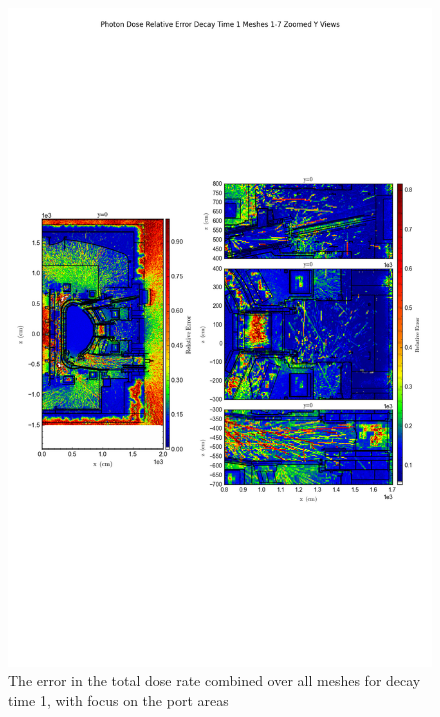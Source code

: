 \documentclass[12pt]{article}
\begin{document}
\begin{figure}[ht!]
\centering
\includegraphics[trim={0cm 9cm 0cm 10cm},clip,scale=0.75]{../plots/final_model/Photon_Dose_Relative_Error_Decay_Time_1_Meshes_1-7_Zoomed_Y_Views.png}
\caption{The error in the total dose rate combined over all meshes for decay time 1, with focus on the port areas}
\label{fig:photons_dc1_no4bc_total_error_zoomed}
\end{figure}

\clearpage
\end{document}
